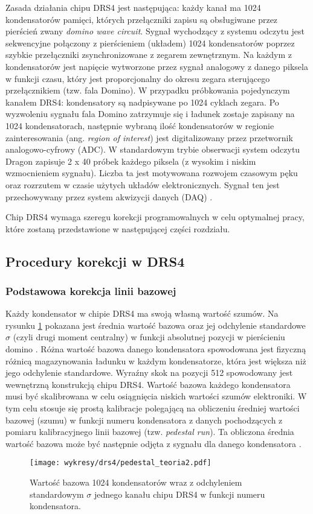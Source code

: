 \documentclass[a4paper,11pt,twoside]{article}
\begin{document}
Zasada działania chipu DRS4 jest następująca: każdy kanał ma 1024 kondensatorów pamięci, których przełączniki zapisu są obsługiwane przez pierścień zwany \textsl{domino wave circuit}. Sygnał wychodzący z systemu odczytu jest sekwencyjne połączony z pierścieniem (układem) 1024 kondensatorów poprzez szybkie przełączniki zsynchronizowane z zegarem zewnętrznym. Na każdym z kondensatorów jest napięcie wytworzone przez sygnał analogowy z danego piksela w funkcji czasu, który jest proporcjonalny do okresu zegara sterującego przełącznikiem (tzw. fala Domino). W przypadku próbkowania pojedynczym kanałem DRS4: kondensatory są nadpisywane po 1024 cyklach zegara. Po wyzwoleniu sygnału fala Domino zatrzymuje się i ładunek zostaje zapisany na 1024 kondensatorach, następnie wybraną ilość kondensatorów w regionie zainteresowania (ang. \textsl{region of interest}) jest digitalizowany przez przetwornik analogowo-cyfrowy (ADC). W standardowym trybie obserwacji system odczytu Dragon zapisuje 2 x 40 próbek każdego piksela (z wysokim i niskim wzmocnieniem sygnału). Liczba ta jest motywowana rozwojem czasowym pęku oraz rozrzutem w czasie użytych układów elektronicznych. Sygnał ten jest przechowywany przez system akwizycji danych (DAQ) \cite{drs4_psi}. 

Chip DRS4 wymaga szeregu korekcji programowalnych w celu optymalnej pracy, które zostaną przedstawione w następującej części rozdziału.
\subsection{Procedury korekcji w DRS4}
\subsubsection{Podstawowa korekcja linii bazowej}
Każdy kondensator w chipie DRS4 ma swoją własną wartość szumów. Na rysunku \ref{fig:baseline_cap} pokazana jest średnia wartość bazowa oraz jej odchylenie standardowe $\sigma$ (czyli drugi moment centralny) w funkcji absolutnej pozycji w pierścieniu domino . Różna wartość bazowa danego kondensatora spowodowana jest fizyczną różnicą magazynowania ładunku w każdym kondensatorze, która jest większa niż jego odchylenie standardowe. Wyraźny skok na pozycji 512 spowodowany jest wewnętrzną konstrukcją chipu DRS4. Wartość bazowa każdego kondensatora musi być skalibrowana w celu osiągnięcia niskich wartości szumów elektroniki. W tym celu stosuje się prostą kalibracje polegającą na obliczeniu średniej wartości bazowej (szumu) w funkcji numeru kondensatora z danych pochodzących z pomiaru kalibracyjnego linii bazowej (tzw. \textsl{pedestal run}). Ta obliczona średnia wartość bazowa może być następnie odjęta z sygnału dla danego kondensatora \cite{drs4_magic}. 
\begin{figure}[H] 
\centering
\texttt{[image: wykresy/drs4/pedestal\_teoria2.pdf]}
\caption{Wartość bazowa 1024 kondensatorów wraz z odchyleniem standardowym $\sigma$ jednego kanału chipu DRS4 w funkcji numeru kondensatora.}
\label{fig:baseline_cap}
\end{figure}
\end{document}
